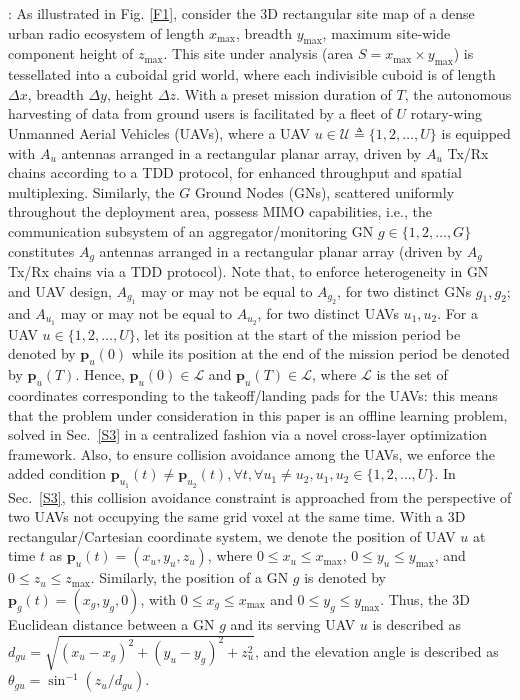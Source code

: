 \documentclass[10pt, twocolumn]{IEEEtran}
\begin{document}
: As illustrated in Fig. \ref{F1}, consider the 3D rectangular site map of a dense urban radio ecosystem of length $x_{\mathrm{max}}$, breadth $y_{\mathrm{max}}$, maximum site-wide component height of $z_{\mathrm{max}}$. This site under analysis (area $S{=}x_{\mathrm{max}}{\times}y_{\mathrm{max}}$) is tessellated into a cuboidal grid world, where each indivisible cuboid is of length $\Delta x$, breadth $\Delta y$, height $\Delta z$. With a preset mission duration of $T$, the autonomous harvesting of data from ground users is facilitated by a fleet of $U$ rotary-wing Unmanned Aerial Vehicles (UAVs), where a UAV $u \in \mathcal{U}{\triangleq}\{1,2,{\dots},U\}$ is equipped with $A_{u}$ antennas arranged in a rectangular planar array, driven by $A_{u}$ Tx/Rx chains according to a TDD protocol, for enhanced throughput and spatial multiplexing. Similarly, the $G$ Ground Nodes (GNs), scattered uniformly throughout the deployment area, possess MIMO capabilities, i.e., the communication subsystem of an aggregator/monitoring GN $g{\in}\{1,2,{\dots},G\}$ constitutes $A_{g}$ antennas arranged in a rectangular planar array (driven by $A_{g}$ Tx/Rx chains via a TDD protocol). Note that, to enforce heterogeneity in GN and UAV design, $A_{g_{1}}$ may or may not be equal to $A_{g_{2}}$, for two distinct GNs $g_{1},g_{2}$; and $A_{u_{1}}$ may or may not be equal to $A_{u_{2}}$, for two distinct UAVs $u_{1},u_{2}$. For a UAV $u{\in}\{1,2,{\dots},U\}$, let its position at the start of the mission period be denoted by $\mathbf{p}_{u}(0)$ while its position at the end of the mission period be denoted by $\mathbf{p}_{u}(T)$. Hence, $\mathbf{p}_{u}(0){\in}\mathcal{L}$ and $\mathbf{p}_{u}(T){\in}\mathcal{L}$, where $\mathcal{L}$ is the set of coordinates corresponding to the takeoff/landing pads for the UAVs: this means that the problem under consideration in this paper is an offline learning problem, solved in Sec.~\ref{S3} in a centralized fashion via a novel cross-layer optimization framework. Also, to ensure collision avoidance among the UAVs, we enforce the added condition $\mathbf{p}_{u_{1}}(t){\neq}\mathbf{p}_{u_{2}}(t),{\forall}t,{\forall}u_{1}{\neq}u_{2},u_{1},u_{2}{\in}\{1,2,{\dots},U\}$. In Sec.~\ref{S3}, this collision avoidance constraint is approached from the perspective of two UAVs not occupying the same grid voxel at the same time. With a $3$D rectangular/Cartesian coordinate system, we denote the position of UAV $u$ at time $t$ as $\mathbf{p}_{u}(t){=}(x_{u},y_{u},z_{u})$, where $0{\leq}x_{u}{\leq}x_{\mathrm{max}}$, $0{\leq}y_{u}{\leq}y_{\mathrm{max}}$, and $0{\leq}z_{u}{\leq}z_{\mathrm{max}}$. Similarly, the position of a GN $g$ is denoted by $\mathbf{p}_{g}(t){=}(x_{g},y_{g},0)$, with $0{\leq}x_{g}{\leq}x_{\mathrm{max}}$ and $0{\leq}y_{g}{\leq}y_{\mathrm{max}}$. Thus, the $3$D Euclidean distance between a GN $g$ and its serving UAV $u$ is described as $d_{gu}{=}\sqrt{(x_{u}{-}x_{g})^{2}{+}(y_{u}{-}y_{g})^{2}{+}z_{u}^{2}}$, and the elevation angle is described as $\theta_{gu}{=}\sin^{-1}{(z_{u}/d_{gu})}$.\\
\end{document}
